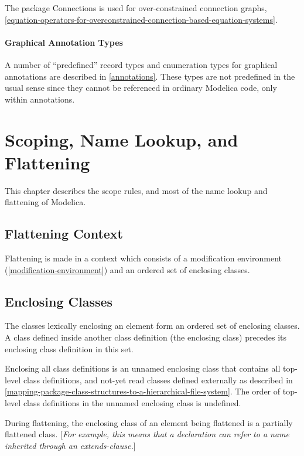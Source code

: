 \documentclass[10pt,a4paper]{report}
\def\doublelabel#1{\label{#1}}
\begin{document}
The package Connections is used for over-constrained connection graphs,
\ref{equation-operators-for-overconstrained-connection-based-equation-systems}.

\subsubsection{Graphical Annotation Types}\doublelabel{graphical-annotation-types}

A number of ``predefined'' record types and enumeration types for
graphical annotations are described in \ref{annotations}. These types are not
predefined in the usual sense since they cannot be referenced in
ordinary Modelica code, only within annotations.

\chapter{Scoping, Name Lookup, and Flattening}\doublelabel{scoping-name-lookup-and-flattening}

This chapter describes the scope rules, and most of the name lookup and
flattening of Modelica.

\section{Flattening Context}\doublelabel{flattening-context}

Flattening is made in a context which consists of a modification
environment (\ref{modification-environment}) and an ordered set of enclosing classes.

\section{Enclosing Classes}\doublelabel{enclosing-classes}

The classes lexically enclosing an element form an ordered set of
enclosing classes. A class defined inside another class definition (the
enclosing class) precedes its enclosing class definition in this set.

Enclosing all class definitions is an unnamed enclosing class that
contains all top-level class definitions, and not-yet read classes
defined externally as described in \ref{mapping-package-class-structures-to-a-hierarchical-file-system}. The order of
top-level class definitions in the unnamed enclosing class is undefined.

During flattening, the enclosing class of an element being flattened is
a partially flattened class. {[}\emph{For example, this means that a
declaration can refer to a name inherited through an extends-clause.}{]}
\end{document}
